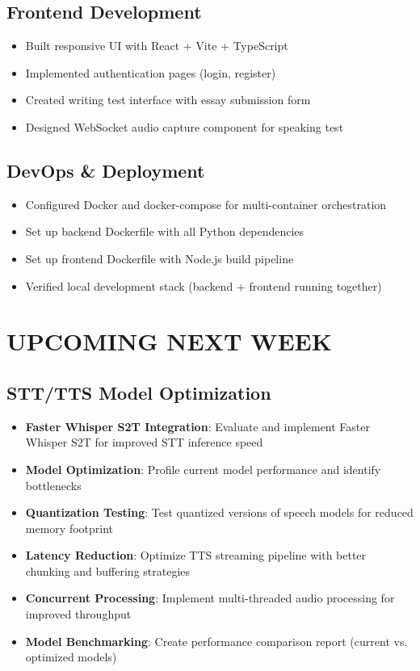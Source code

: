 \documentclass[11pt]{article}
\begin{document}
\subsection{Frontend Development}
\begin{itemize}[leftmargin=2em]
    \item Built responsive UI with React + Vite + TypeScript
    \item Implemented authentication pages (login, register)
    \item Created writing test interface with essay submission form
    \item Designed WebSocket audio capture component for speaking test
\end{itemize}

\subsection{DevOps \& Deployment}
\begin{itemize}[leftmargin=2em]
    \item Configured Docker and docker-compose for multi-container orchestration
    \item Set up backend Dockerfile with all Python dependencies
    \item Set up frontend Dockerfile with Node.js build pipeline
    \item Verified local development stack (backend + frontend running together)
\end{itemize}

\vspace{1cm}
\section*{UPCOMING NEXT WEEK}

\subsection{STT/TTS Model Optimization}
\begin{itemize}[leftmargin=2em]
    \item \textbf{Faster Whisper S2T Integration}: Evaluate and implement Faster Whisper S2T for improved STT inference speed
    \item \textbf{Model Optimization}: Profile current model performance and identify bottlenecks
    \item \textbf{Quantization Testing}: Test quantized versions of speech models for reduced memory footprint
    \item \textbf{Latency Reduction}: Optimize TTS streaming pipeline with better chunking and buffering strategies
    \item \textbf{Concurrent Processing}: Implement multi-threaded audio processing for improved throughput
    \item \textbf{Model Benchmarking}: Create performance comparison report (current vs. optimized models)
\end{itemize}
\end{document}
